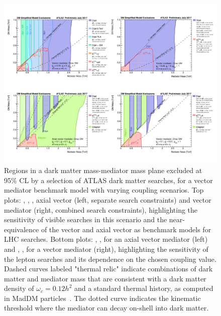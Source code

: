 \begin{figure}[!htpb]
\includegraphics[width=\textwidth]{figures/SummaryPlotsMassMass.pdf}\caption{
Regions in a dark matter mass-mediator mass plane excluded at 95\% CL by a selection of ATLAS dark matter searches, for a vector mediator benchmark model with varying coupling scenarios. Top plots: , , , axial vector (left, separate search constraints) and vector mediator (right, combined search constraints), highlighting the sensitivity of visible searches in this scenario and the near-equivalence of the vector and axial vector as benchmark models for LHC searches. Bottom plots: , ,  for an axial vector mediator (left) and , ,  for a vector mediator (right), highlighting the sensitivity of the lepton searches and its dependence on the chosen coupling value. Dashed curves labeled "thermal relic" indicate combinations of dark matter and mediator mass that are consistent with a dark matter density of $\omega_c = 0.12 h^2$ and a standard thermal history, as computed in MadDM particles~\cite{Backovic:2015cra}. The dotted curve indicates the kinematic threshold where the mediator can decay on-shell into dark matter. }
\label{fig:sensitivityComparison}
\end{figure}


